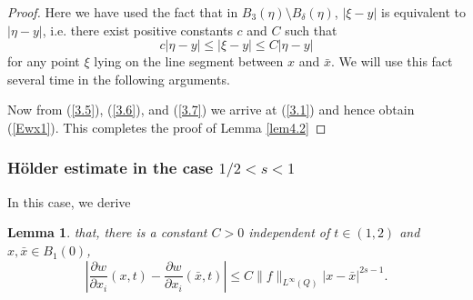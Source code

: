 \documentclass[12pt]{article}
\newtheorem{lemma}[definition]{Lemma}
\theoremstyle{remark}
\numberwithin{equation}{section}
\begin{document}
\begin{proof}
Here we have used the fact that in $B_3(\eta) \setminus B_\delta(\eta)$, $|\xi -y|$ is equivalent to $|\eta -y|$, i.e.
there exist positive constants $c$ and $C$ such that
$$ c |\eta - y| \leq |\xi -y| \leq C |\eta -y| $$
for any point $\xi$ lying on the line segment between $x$ and $\bar{x}$. We will use this fact several time in the following arguments.

Now from (\ref{3.5}), (\ref{3.6}), and (\ref{3.7}) we arrive at (\ref{3.1}) and hence obtain (\ref{Ewx1}). This completes the proof of Lemma \ref{lem4.2} \end{proof}


\subsubsection{H\"{o}lder estimate in the case $1/2 < s < 1$ }

In this case, we derive
\begin{lemma} \label{lem4.3}
 that, there is a constant $C>0$ independent of $t \in (1,2)$ and $x, \bar{x} \in B_1(0)$,
\begin{equation}
\left| \frac{\partial w}{\partial x_i} (x,t) - \frac{\partial w}{\partial x_i} (\bar{x},t) \right| \leq C \|f\|_{L^\infty (Q)} |x-\bar{x}|^{2s-1}.
\label{Ewx2}
\end{equation}
\end{lemma}
\end{document}
